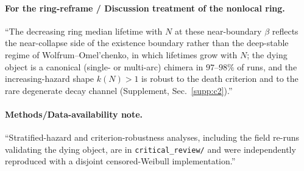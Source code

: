 \documentclass[11pt]{article}
\begin{document}
\paragraph{For the ring-reframe / Discussion treatment of the nonlocal ring.} ``The
decreasing ring median lifetime with $N$ at these near-boundary $\beta$ reflects the
near-collapse side of the existence boundary rather than the deep-stable regime of
Wolfrum--Omel'chenko, in which lifetimes grow with $N$; the dying object is a canonical
(single- or multi-arc) chimera in $97$--$98\%$ of runs, and the increasing-hazard shape
$k(N)>1$ is robust to the death criterion and to the rare degenerate decay channel
(Supplement, Sec.~\ref{supp:c2}).''

\paragraph{Methods/Data-availability note.} ``Stratified-hazard and criterion-robustness
analyses, including the field re-runs validating the dying object, are in
\texttt{critical\_review/} and were independently reproduced with a disjoint
censored-Weibull implementation.''
\end{document}
